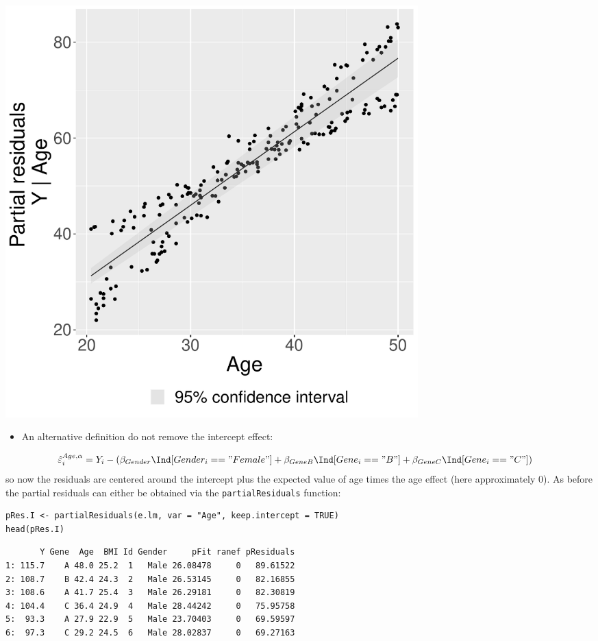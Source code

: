 \documentclass[12pt]{article}
\begin{document}
\begin{center}
\includegraphics[width=0.7\textwidth]{./figures/fig-butils-plotConf-noI.pdf}
\end{center}

\begin{itemize}
\item An alternative definition do not remove the intercept effect:
\end{itemize}
\begin{align*}
\hat{\varepsilon}^{Age,\alpha}_i &= Y_i - \left(\beta_{Gender} \Ind[Gender_i=="Female"] + \beta_{GeneB} \Ind[Gene_i=="B"] + \beta_{GeneC} \Ind[Gene_i=="C"]\right)
\end{align*}
so now the residuals are centered around the intercept plus the
expected value of age times the age effect (here approximately 0). As
before the partial residuals can either be obtained via the
\texttt{partialResiduals} function:
\lstset{language=r,label= ,caption= ,captionpos=b,numbers=none}
\begin{lstlisting}
pRes.I <- partialResiduals(e.lm, var = "Age", keep.intercept = TRUE)
head(pRes.I)
\end{lstlisting}

\begin{verbatim}
       Y Gene  Age  BMI Id Gender     pFit ranef pResiduals
1: 115.7    A 48.0 25.2  1   Male 26.08478     0   89.61522
2: 108.7    B 42.4 24.3  2   Male 26.53145     0   82.16855
3: 108.6    A 41.7 25.4  3   Male 26.29181     0   82.30819
4: 104.4    C 36.4 24.9  4   Male 28.44242     0   75.95758
5:  93.3    A 27.9 22.9  5   Male 23.70403     0   69.59597
6:  97.3    C 29.2 24.5  6   Male 28.02837     0   69.27163
\end{verbatim}
\end{document}
